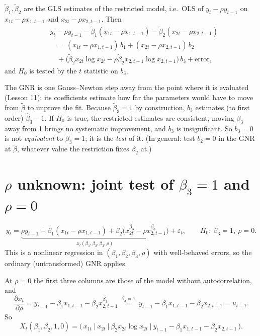 \documentclass[11pt]{article}
\begin{document}
$\tilde\beta_{1},\tilde\beta_{2}$ are the GLS estimates of the restricted model, i.e.\ OLS of
$y_{t}-\rho y_{t-1}$ on $x_{1t}-\rho x_{1,t-1}$ and $x_{2t}-\rho x_{2,t-1}$. Then
\begin{align*}
 &y_{t}-\rho y_{t-1}-\tilde\beta_{1}(x_{1t}-\rho x_{1,t-1})-\tilde\beta_{2}(x_{2t}-\rho x_{2,t-1})\\
 &\quad=(x_{1t}-\rho x_{1,t-1})\,b_{1}+(x_{2t}-\rho x_{2,t-1})\,b_{2}\\
 &\quad+\bigl(\tilde\beta_{2}x_{2t}\log x_{2t}-\rho\tilde\beta_{2}x_{2,t-1}\log x_{2,t-1}\bigr)\,b_{3}
   +\text{error},
\end{align*}
and $H_{0}$ is tested by the $t$ statistic on $b_{3}$.

The GNR is one Gauss--Newton step away from the point where it is evaluated
(Lesson 11): its coefficients estimate how far the parameters would have to move from
$\tilde\beta$ to improve the fit. Because $\tilde\beta_{3}=1$ by construction, $b_{3}$ estimates
(to first order) $\hat\beta_{3}-1$. If $H_{0}$ is true, the restricted estimates are consistent,
moving $\beta_{3}$ away from 1 brings no systematic improvement, and $b_{3}$ is
insignificant. So $b_{3}=0$ is not \emph{equivalent} to $\beta_{3}=1$; it is the \emph{test} of it.
(In general: test $b_{2}=0$ in the GNR at $\tilde\beta$, whatever value the restriction fixes
$\beta_{2}$ at.)

\section{$\rho$ unknown: joint test of $\beta_{3}=1$ and $\rho=0$}

\[ y_{t}=\underbrace{\rho y_{t-1}+\beta_{1}(x_{1t}-\rho x_{1,t-1})
   +\beta_{2}\bigl(x_{2t}^{\beta_{3}}-\rho x_{2,t-1}^{\beta_{3}}\bigr)}_{x_{t}(\beta_{1},\beta_{2},\beta_{3},\rho)}
   +\varepsilon_{t},
   \qquad H_{0}:\ \beta_{3}=1,\ \rho=0 . \]
This is a nonlinear regression in $(\beta_{1},\beta_{2},\beta_{3},\rho)$ with well-behaved errors,
so the ordinary (untransformed) GNR applies.

At $\rho=0$ the first three columns are those of the model without autocorrelation, and
\[ \frac{\partial x_{t}}{\partial\rho}=y_{t-1}-\beta_{1}x_{1,t-1}-\beta_{2}x_{2,t-1}^{\beta_{3}}
   \ \overset{\beta_{3}=1}{=}\ y_{t-1}-\beta_{1}x_{1,t-1}-\beta_{2}x_{2,t-1}=u_{t-1}. \]
So
\[ X_{t}(\beta_{1},\beta_{2},1,0)=\bigl(\,x_{1t}\ \big|\ x_{2t}\ \big|\ \beta_{2}x_{2t}\log x_{2t}\ \big|\
   y_{t-1}-\beta_{1}x_{1,t-1}-\beta_{2}x_{2,t-1}\,\bigr). \]
\end{document}
